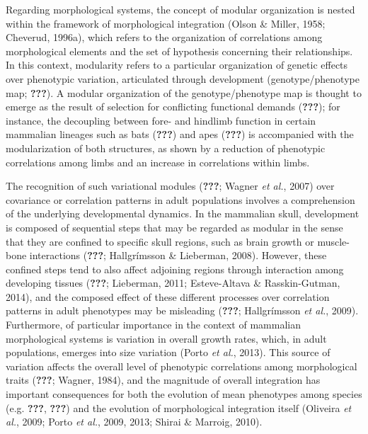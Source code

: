 \documentclass[11pt,twoside]{report}
\begin{document}
Regarding morphological systems, the concept of modular organization is
nested within the framework of morphological integration (Olson \&
Miller, 1958; Cheverud, 1996a), which refers to the organization of
correlations among morphological elements and the set of hypothesis
concerning their relationships. In this context, modularity refers to a
particular organization of genetic effects over phenotypic variation,
articulated through development (genotype/phenotype map;
{\textbf{???}}). A modular organization of the genotype/phenotype map is
thought to emerge as the result of selection for conflicting functional
demands ({\textbf{???}}); for instance, the decoupling between fore- and
hindlimb function in certain mammalian lineages such as bats
({\textbf{???}}) and apes ({\textbf{???}}) is accompanied with the
modularization of both structures, as shown by a reduction of phenotypic
correlations among limbs and an increase in correlations within limbs.

The recognition of such variational modules ({\textbf{???}}; Wagner
\emph{et al.}, 2007) over covariance or correlation patterns in adult
populations involves a comprehension of the underlying developmental
dynamics. In the mammalian skull, development is composed of sequential
steps that may be regarded as modular in the sense that they are
confined to specific skull regions, such as brain growth or muscle-bone
interactions ({\textbf{???}}; Hallgrímsson \& Lieberman, 2008). However,
these confined steps tend to also affect adjoining regions through
interaction among developing tissues ({\textbf{???}}; Lieberman, 2011;
Esteve-Altava \& Rasskin-Gutman, 2014), and the composed effect of these
different processes over correlation patterns in adult phenotypes may be
misleading ({\textbf{???}}; Hallgrímsson \emph{et al.}, 2009).
Furthermore, of particular importance in the context of mammalian
morphological systems is variation in overall growth rates, which, in
adult populations, emerges into size variation (Porto \emph{et al.},
2013). This source of variation affects the overall level of phenotypic
correlations among morphological traits ({\textbf{???}}; Wagner, 1984),
and the magnitude of overall integration has important consequences for
both the evolution of mean phenotypes among species (e.g.
{\textbf{???}}, {\textbf{???}}) and the evolution of morphological
integration itself (Oliveira \emph{et al.}, 2009; Porto \emph{et al.},
2009, 2013; Shirai \& Marroig, 2010).
\end{document}
